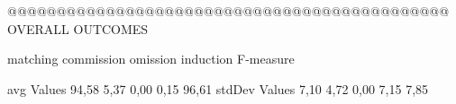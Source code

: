  @@@@@@@@@@@@@@@@@@@@@@@@@@@@@@@@@@@@@@@@@@@@@ OVERALL OUTCOMES

            matching commission   omission  induction  F-measure

avg Values      94,58    5,37       0,00      0,15       96,61       
stdDev Values    7,10    4,72       0,00      7,15        7,85       
